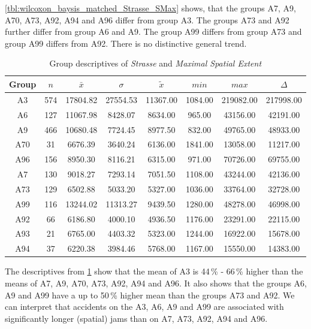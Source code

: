 \cref{tbl:wilcoxon_baysis_matched_Strasse_SMax} shows, that the groups A7, A9, A70, A73, A92, A94 and A96 differ from group A3. The groups A73 and A92 further differ from group A6 and A9. The group A99 differs from group A73 and group A99 differs from A92. There is no distinctive general trend.
\begin{table}[ht]
	\tiny
	\centering
	\begin{tabular}{c|c|c|c|c|c|c|c}
		\toprule
		Group & $n$ & $\bar{x}$ & $\sigma$ & $\tilde{x}$ & $min$ & $max$ & $\Delta$ \\  
		\midrule
		A3 & 574 & 17804.82 & 27554.53 & 11367.00 & 1084.00 & 219082.00 & 217998.00 \\ 
		A6 & 127 & 11067.98 & 8428.07 & 8634.00  & 965.00 & 43156.00 & 42191.00 \\ 
		A9 & 466 & 10680.48 & 7724.45 & 8977.50 & 832.00 & 49765.00 & 48933.00 \\ 
		A70 & 31 & 6676.39 & 3640.24 & 6136.00 & 1841.00 & 13058.00 & 11217.00 \\ 
		A96 & 156 & 8950.30 & 8116.21 & 6315.00 & 971.00 & 70726.00 & 69755.00 \\ 
		A7 & 130 & 9018.27 & 7293.14 & 7051.50 & 1108.00 & 43244.00 & 42136.00 \\ 
		A73 & 129 & 6502.88 & 5033.20 & 5327.00 & 1036.00 & 33764.00 & 32728.00 \\ 
		A99 & 116 & 13244.02 & 11313.27 & 9439.50 & 1280.00 & 48278.00 & 46998.00 \\ 
		A92 & 66 & 6186.80 & 4000.10 & 4936.50 & 1176.00 & 23291.00 & 22115.00 \\ 
		A93 & 21 & 6765.00 & 4403.32 & 5323.00 & 1244.00 & 16922.00 & 15678.00 \\ 
		A94 & 37 & 6220.38 & 3984.46 & 5768.00 & 1167.00 & 15550.00 & 14383.00 \\ 
		\bottomrule
	\end{tabular}
	\caption{Group descriptives of \textit{Strasse} and \textit{Maximal Spatial Extent}}
	\label{tbl:descriptives_baysis_matched_Strasse_SMax}
\end{table}
The descriptives from \cref{tbl:descriptives_baysis_matched_Strasse_SMax} show that the mean of A3 is 44\,\% - 66\,\% higher than the means of A7, A9, A70, A73, A92, A94 and A96. It also shows that the groups A6, A9 and A99 have a up to 50\,\% higher mean than the groups A73 and A92. We can interpret that accidents on the A3, A6, A9 and A99 are associated with significantly longer (spatial) jams than on A7, A73, A92, A94 and A96.

